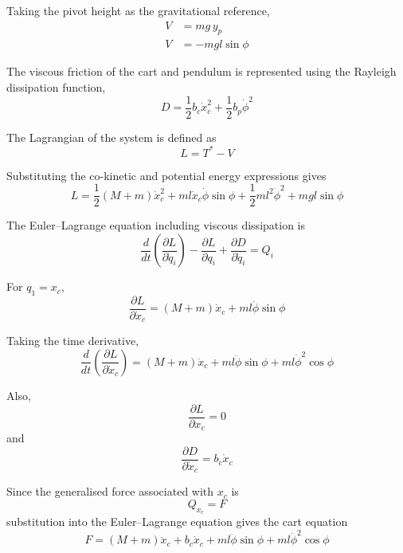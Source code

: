 \documentclass[11pt,a4paper]{article}
\begin{document}
Taking the pivot height as the gravitational reference,
\begin{align*}
	V &= m g\, y_{p} \\
	V &= -m g l \sin\phi
\end{align*}

The viscous friction of the cart and pendulum is represented using the Rayleigh
dissipation function,
\begin{equation*}
	D = \frac{1}{2} b_{c} \dot{x}_{c}^{2} + \frac{1}{2} b_{p} \dot{\phi}^{2}
\end{equation*}

The Lagrangian of the system is defined as
\begin{equation*}
	L = T^{*} - V
\end{equation*}

Substituting the co-kinetic and potential energy expressions gives
\begin{equation*}
	L = \frac{1}{2} \left( M + m \right) \dot{x}_{c}^{2}
	+ m l \dot{x}_{c} \dot{\phi} \sin\phi
	+ \frac{1}{2} m l^{2} \dot{\phi}^{2}
	+ m g l \sin\phi
\end{equation*}

The Euler--Lagrange equation including viscous dissipation is
\begin{equation*}
	\frac{d}{dt} \left( \frac{\partial L}{\partial \dot{q}_{i}} \right)
	- \frac{\partial L}{\partial q_{i}}
	+ \frac{\partial D}{\partial \dot{q}_{i}} = Q_{i}
\end{equation*}

For $q_{1} = x_{c}$,
\begin{equation*}
	\frac{\partial L}{\partial \dot{x}_{c}}
	= \left( M + m \right) \dot{x}_{c} + m l \dot{\phi} \sin\phi
\end{equation*}

Taking the time derivative,
\begin{equation*}
	\frac{d}{dt} \left( \frac{\partial L}{\partial \dot{x}_{c}} \right)
	= \left( M + m \right) \ddot{x}_{c}
	+ m l \ddot{\phi} \sin\phi
	+ m l \dot{\phi}^{2} \cos\phi
\end{equation*}

Also,
\begin{equation*}
	\frac{\partial L}{\partial x_{c}} = 0
\end{equation*}
and
\begin{equation*}
	\frac{\partial D}{\partial \dot{x}_{c}} = b_{c} \dot{x}_{c}
\end{equation*}

Since the generalised force associated with $x_{c}$ is
\begin{equation*}
	Q_{x_{c}} = F
\end{equation*}
substitution into the Euler--Lagrange equation gives the cart equation
\begin{equation*}
	\boxed{\;
		F = \left( M + m \right) \ddot{x}_{c}
		+ b_{c} \dot{x}_{c}
		+ m l \ddot{\phi} \sin\phi
		+ m l \dot{\phi}^{2} \cos\phi
		\;} \tag{1a}
\end{equation*}
\end{document}
